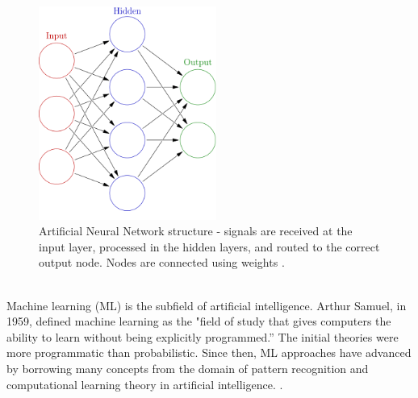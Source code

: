 \begin{figure}[H]
    \centering
    \includegraphics[width=\textwidth,height=7cm,keepaspectratio=true]{src/Images/Colored_neural_network.svg.png}
    \caption{
         Artificial Neural Network structure - signals are received at the input layer, processed in the hidden layers, and routed to the correct output node. Nodes are connected using weights \cite{ann_img}. 
    }
\end{figure}
\\

Machine learning (ML) is the subfield of artificial intelligence. Arthur Samuel, in 1959, defined machine learning as the "field of study that gives computers the ability to learn without being explicitly programmed.” The initial theories were more programmatic than probabilistic. Since then, ML approaches have advanced by borrowing many concepts from the domain of pattern recognition and computational learning theory in artificial intelligence. \cite{munoz2014machine}. \\

